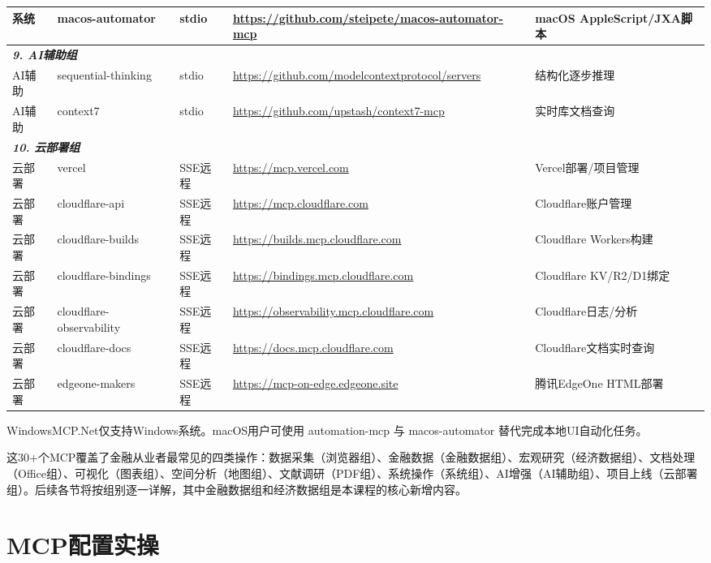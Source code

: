 \begin{table}[H]
\begin{tabular}{llllp{4cm}}
系统 & macos-automator & stdio & \url{https://github.com/steipete/macos-automator-mcp} & macOS AppleScript/JXA脚本 \\
\midrule
\multicolumn{5}{l}{\textit{\textbf{9. AI辅助组}}} \\
\midrule
AI辅助 & sequential-thinking & stdio & \url{https://github.com/modelcontextprotocol/servers} & 结构化逐步推理 \\
AI辅助 & context7 & stdio & \url{https://github.com/upstash/context7-mcp} & 实时库文档查询 \\
\midrule
\multicolumn{5}{l}{\textit{\textbf{10. 云部署组}}} \\
\midrule
云部署 & vercel & SSE远程 & \url{https://mcp.vercel.com} & Vercel部署/项目管理 \\
云部署 & cloudflare-api & SSE远程 & \url{https://mcp.cloudflare.com} & Cloudflare账户管理 \\
云部署 & cloudflare-builds & SSE远程 & \url{https://builds.mcp.cloudflare.com} & Cloudflare Workers构建 \\
云部署 & cloudflare-bindings & SSE远程 & \url{https://bindings.mcp.cloudflare.com} & Cloudflare KV/R2/D1绑定 \\
云部署 & cloudflare-observability & SSE远程 & \url{https://observability.mcp.cloudflare.com} & Cloudflare日志/分析 \\
云部署 & cloudflare-docs & SSE远程 & \url{https://docs.mcp.cloudflare.com} & Cloudflare文档实时查询 \\
云部署 & edgeone-makers & SSE远程 & \url{https://mcp-on-edge.edgeone.site} & 腾讯EdgeOne HTML部署 \\
\bottomrule
\end{tabular}
\end{table}

\begin{warningbox}[macOS注意]
WindowsMCP.Net仅支持Windows系统。macOS用户可使用 automation-mcp 与 macos-automator 替代完成本地UI自动化任务。
\end{warningbox}

这30+个MCP覆盖了金融从业者最常见的四类操作：数据采集（浏览器组）、金融数据（金融数据组）、宏观研究（经济数据组）、文档处理（Office组）、可视化（图表组）、空间分析（地图组）、文献调研（PDF组）、系统操作（系统组）、AI增强（AI辅助组）、项目上线（云部署组）。后续各节将按组别逐一详解，其中金融数据组和经济数据组是本课程的核心新增内容。

\section{MCP配置实操}


